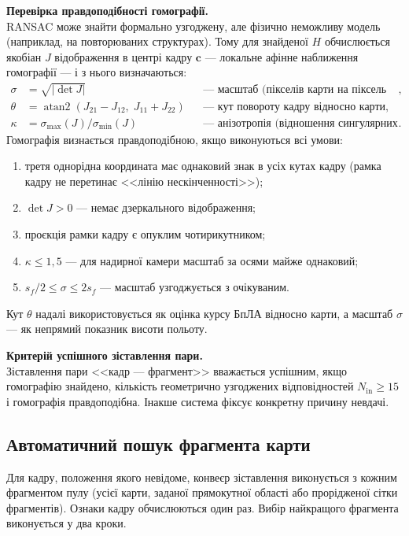 \textbf{Перевірка правдоподібності гомографії.}\\
RANSAC може знайти формально узгоджену, але фізично неможливу модель (наприклад, на повторюваних структурах). Тому для знайденої $H$ обчислюється якобіан $J$ відображення в центрі кадру $\mathbf{c}$ --- локальне афінне наближення гомографії --- і з нього визначаються:
\begin{align}
\sigma &= \sqrt{|\det J|} && \text{--- масштаб (пікселів карти на піксель кадру)}, \\
\theta &= \operatorname{atan2}(J_{21} - J_{12},\; J_{11} + J_{22}) && \text{--- кут повороту кадру відносно карти}, \\
\kappa &= \sigma_{\max}(J) / \sigma_{\min}(J) && \text{--- анізотропія (відношення сингулярних чисел)}.
\end{align}
Гомографія визнається правдоподібною, якщо виконуються всі умови:
\begin{enumerate}
    \item третя однорідна координата має однаковий знак в усіх кутах кадру (рамка кадру не перетинає <<лінію нескінченності>>);
    \item $\det J > 0$ --- немає дзеркального відображення;
    \item проєкція рамки кадру є опуклим чотирикутником;
    \item $\kappa \le 1{,}5$ --- для надирної камери масштаб за осями майже однаковий;
    \item $s_f / 2 \le \sigma \le 2 s_f$ --- масштаб узгоджується з очікуваним.
\end{enumerate}
Кут $\theta$ надалі використовується як оцінка курсу БпЛА відносно карти, а масштаб $\sigma$ --- як непрямий показник висоти польоту.

\textbf{Критерій успішного зіставлення пари.}\\
Зіставлення пари <<кадр --- фрагмент>> вважається успішним, якщо гомографію знайдено, кількість геометрично узгоджених відповідностей $N_{\text{in}} \ge 15$ і гомографія правдоподібна. Інакше система фіксує конкретну причину невдачі.

\subsection{Автоматичний пошук фрагмента карти}
\label{sec:search}

Для кадру, положення якого невідоме, конвеєр зіставлення виконується з кожним фрагментом пулу (усієї карти, заданої прямокутної області або прорідженої сітки фрагментів). Ознаки кадру обчислюються один раз. Вибір найкращого фрагмента виконується у два кроки.

